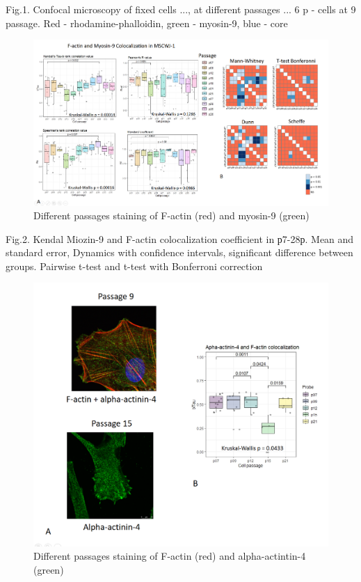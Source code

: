 \documentclass[english,authoryear]{elsarticle}
\begin{document}
Fig.1. Confocal microscopy of fixed cells ..., at different passages ... 6 p - cells at 9 passage. Red - rhodamine-phalloidin, green - myosin-9, blue - core

\begin{figure}[hbt!]
\centering
\includegraphics[width=0.9\linewidth]{fig2.png}
\caption{Different passages staining of F-actin (red) and myosin-9 (green)}
\label{fig:fig2}
\end{figure}

Fig.2. Kendal Miozin-9 and F-actin colocalization coefficient in р7-28р. Mean and standard error, Dynamics with confidence intervals, significant difference between groups. Pairwise t-test and t-test with Bonferroni correction

\begin{figure}[hbt!]
\centering
\includegraphics[width=0.9\linewidth]{fig6.png}
\caption{Different passages staining of F-actin (red) and alpha-actintin-4 (green)}
\label{fig:fig6}
\end{figure}
\end{document}
